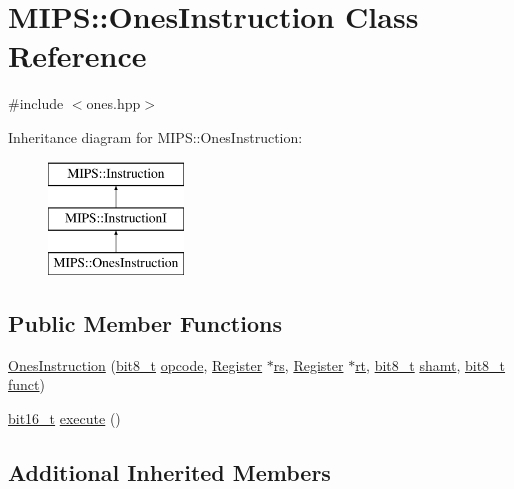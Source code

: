 \hypertarget{classMIPS_1_1OnesInstruction}{}\section{M\+I\+PS\+:\+:Ones\+Instruction Class Reference}
\label{classMIPS_1_1OnesInstruction}


{\ttfamily \#include $<$ones.\+hpp$>$}

Inheritance diagram for M\+I\+PS\+:\+:Ones\+Instruction\+:\begin{figure}[H]
\begin{center}
\leavevmode
\includegraphics[height=3.000000cm]{classMIPS_1_1OnesInstruction}
\end{center}
\end{figure}
\subsection*{Public Member Functions}
\begin{DoxyCompactItemize}
\item 
\hyperlink{classMIPS_1_1OnesInstruction_ac12775ee6e4e5c1a33636384c4f6244e}{Ones\+Instruction} (\hyperlink{core_8hpp_a6074bae122ae7b527864eec42c728c3c}{bit8\+\_\+t} \hyperlink{classMIPS_1_1Instruction_a45cc6808b5dde8a5d41067d148b55476}{opcode}, \hyperlink{classMIPS_1_1Register}{Register} $\ast$\hyperlink{classMIPS_1_1InstructionI_a2be191d5b3dce505e2e626ec02eb4d62}{rs}, \hyperlink{classMIPS_1_1Register}{Register} $\ast$\hyperlink{classMIPS_1_1InstructionI_add1db07a5c954f35271de8c8a5737487}{rt}, \hyperlink{core_8hpp_a6074bae122ae7b527864eec42c728c3c}{bit8\+\_\+t} \hyperlink{classMIPS_1_1InstructionI_aa9b6da37c374c2ec8d96448d341e5e7d}{shamt}, \hyperlink{core_8hpp_a6074bae122ae7b527864eec42c728c3c}{bit8\+\_\+t} \hyperlink{classMIPS_1_1InstructionI_a5c6efcbbd233a7447c1fe24ea0a1e558}{funct})
\item 
\hyperlink{core_8hpp_adc265a970bc35995b5879784bbb3f1b7}{bit16\+\_\+t} \hyperlink{classMIPS_1_1OnesInstruction_aeab25fd32df5c092d4f426371f3f1ff3}{execute} ()
\end{DoxyCompactItemize}
\subsection*{Additional Inherited Members}


